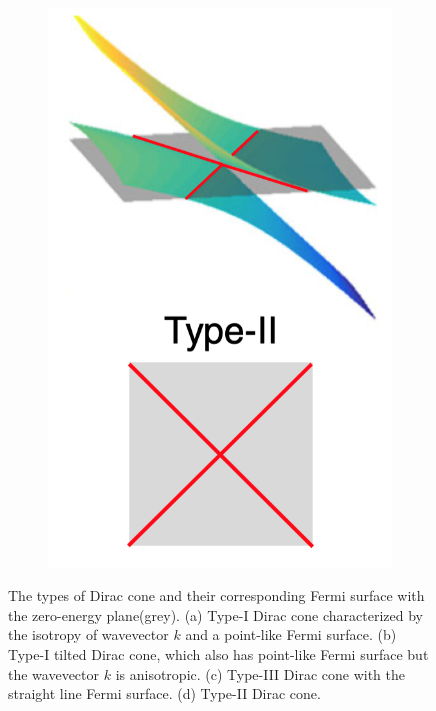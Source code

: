 \begin{figure}[H]
\begin{subfigure}[b]{0.2\linewidth}
            \includegraphics[width = \linewidth]{fig/Chap 2/Type II.png}
            \caption{}
            \label{2fig:type2}
        \end{subfigure}
    \caption{The types of Dirac cone and their corresponding Fermi surface with the zero-energy plane(grey). 
                (a) Type-I Dirac cone characterized by the isotropy of wavevector $k$ and a point-like Fermi surface.
                (b) Type-I tilted Dirac cone, which also has point-like Fermi surface but the wavevector $k$ is anisotropic.
                (c) Type-III Dirac cone with the straight line Fermi surface.
                (d) Type-II Dirac cone.}
    \label{2fig:Dirac cone type}
    \end{figure}
